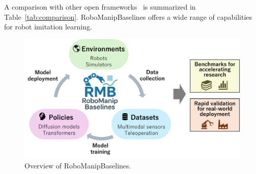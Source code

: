 \documentclass[letterpaper, 10 pt, conference]{ieeeconf}  %
\newcommand{\tabref}[1]{{Table~\ref{#1}}}
\begin{document}
A comparison with other open frameworks~\cite{Robomimic:Mandlekar:CoRL2021,LIBERO:Liu:NeurIPS2023,Maniskill:Tao:RSS2025,RoboHive:Kumar:NeurIPS2023,RoboCasa:Nasiriany:RSS2024,D3IL:Jia:ICLR2024,Colosseum:Pumacay:RSS2024,LeRobot:Cadene:GitHub2024,RoboVerse:Geng:RSS2025} is summarized in \tabref{tab:comparison}.
RoboManipBaselines offers a wide range of capabilities for robot imitation learning.

\begin{figure}[tb]
  \centering
  \includegraphics[width=0.99\columnwidth]{figs/overview2.jpg}
  \caption{Overview of RoboManipBaselines.}
  \label{fig:overview}
\end{figure}
\end{document}
